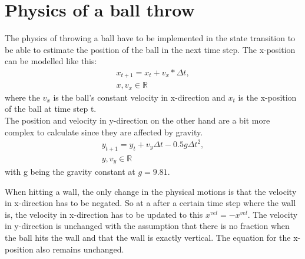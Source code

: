 \documentclass[conference]{IEEEtran}
\begin{document}



\section{Physics of a ball throw}
The physics of throwing a ball have to be implemented in the state transition to be able to estimate the position of the ball in the next time step.  
The x-position can be modelled like this:
\begin{equation*}
    \begin{aligned}
    x_{t+1} = x_{t} + v_x * \Delta t,   \\
    x, v_x \in \mathbb{R}
    \end{aligned}
    \tag{1}
\end{equation*}
where the ${v_x}$ is the ball's constant velocity in x-direction and $x_t$ is the x-position of the ball at time step t. \\
The position and velocity in y-direction on the other hand are a bit more complex to calculate since they are affected by gravity.
\begin{equation*}
    \begin{aligned}
    y_{t+1} = y_t + v_y \Delta t - 0.5 g \Delta t^2, \\
    y, v_y \in \mathbb{R}
    \end{aligned}
    \tag{2}
\end{equation*}
with g being the gravity constant at $g = 9.81$.

When hitting a wall, the only change in the physical motions is that the velocity in x-direction has to be negated.
So at a after a certain time step where the wall is, the velocity in x-direction has to be updated to this $x^{vel} = -x^{vel}$.
The velocity in y-direction is unchanged with the assumption that there is no fraction when the ball hits the wall and that the wall is exactly vertical. 
The equation for the x-position also remains unchanged.
\end{document}
